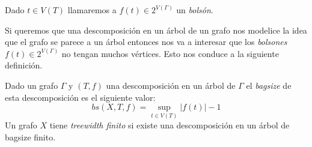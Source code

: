 \documentclass[tesis.tex]{subfiles}
\begin{document}
Dado $t \in V(T)$ llamaremos a $f(t) \in 2^{V(\Gamma)}$ un \emph{bolsón}.
\smallskip

Si queremos que una descomposición en un árbol de un grafo nos modelice la idea que el grafo se parece a un árbol entonces nos va a interesar que los \emph{bolsones} $f(t) \in 2^{V(\Gamma)}$ no tengan muchos vértices. 
Esto nos conduce a la siguiente definición.



\begin{deff}
	Dado un grafo $\Gamma$ y $(T,f)$ una descomposición en un árbol de $\Gamma$ el \emph{bagsize} de esta descomposición es el siguiente valor:
	\begin{equation*}
		bs(X,T,f) = \sup_{t \in V(T)} |f(t)| - 1
	\end{equation*}
	Un grafo $X$ tiene \emph{treewidth finito} si existe una descomposición en un árbol de bagsize finito.	
\end{deff}
\end{document}
